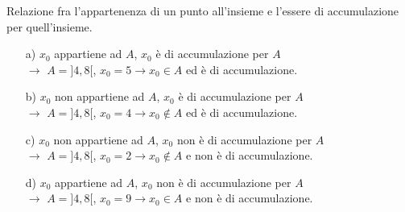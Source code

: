 \begin{esempio}
Relazione fra l'appartenenza di un punto all'insieme e l'essere di 
accumulazione per quell'insieme.
\begin{itemize}
  \item[a)] $x_0$ appartiene ad $A$, $x_0$ è di accumulazione per $A$\\
 $\longrightarrow$ $A=]4,8[$, $x_0=5\rightarrow x_0\in A$ ed è di 
accumulazione.
  \item[b)]  $x_0$ non appartiene ad $A$, $x_0$ è di accumulazione per 
$A$\\
 $\longrightarrow$ $A=]4,8[$, $x_0=4\rightarrow x_0\notin A$ ed è di 
accumulazione.
  \item[c)]  $x_0$ non appartiene ad $A$, $x_0$ non è di accumulazione 
per $A$\\
 $\longrightarrow$ $A=]4,8[$, $x_0=2\rightarrow x_0\notin A$ e non è di 
accumulazione.
  \item[d)] $x_0$ appartiene ad $A$, $x_0$ non è di accumulazione per 
$A$\\
  $\longrightarrow$ $A=]4,8[$, $x_0=9\rightarrow x_0\in A$ e non 
è di accumulazione.
\end{itemize}
\end{esempio}

